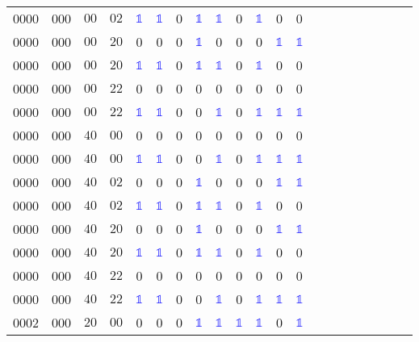 \begin{longtable*}{c| cccccccccccccccccccc }
0000& 000& $00$& $02$& \textcolor{blue}{$\mathds{1}$}& \textcolor{blue}{$\mathds{1}$}& 0& \textcolor{blue}{$\mathds{1}$}& \textcolor{blue}{$\mathds{1}$}& 0& \textcolor{blue}{$\mathds{1}$}& 0& 0\\
0000& 000& $00$& $20$& 0& 0& 0& \textcolor{blue}{$\mathds{1}$}& 0& 0& 0& \textcolor{blue}{$\mathds{1}$}& \textcolor{blue}{$\mathds{1}$}\\
0000& 000& $00$& $20$& \textcolor{blue}{$\mathds{1}$}& \textcolor{blue}{$\mathds{1}$}& 0& \textcolor{blue}{$\mathds{1}$}& \textcolor{blue}{$\mathds{1}$}& 0& \textcolor{blue}{$\mathds{1}$}& 0& 0\\
0000& 000& $00$& $22$& 0& 0& 0& 0& 0& 0& 0& 0& 0\\
0000& 000& $00$& $22$& \textcolor{blue}{$\mathds{1}$}& \textcolor{blue}{$\mathds{1}$}& 0& 0& \textcolor{blue}{$\mathds{1}$}& 0& \textcolor{blue}{$\mathds{1}$}& \textcolor{blue}{$\mathds{1}$}& \textcolor{blue}{$\mathds{1}$}\\
0000& 000& $40$& $00$& 0& 0& 0& 0& 0& 0& 0& 0& 0\\
0000& 000& $40$& $00$& \textcolor{blue}{$\mathds{1}$}& \textcolor{blue}{$\mathds{1}$}& 0& 0& \textcolor{blue}{$\mathds{1}$}& 0& \textcolor{blue}{$\mathds{1}$}& \textcolor{blue}{$\mathds{1}$}& \textcolor{blue}{$\mathds{1}$}\\
0000& 000& $40$& $02$& 0& 0& 0& \textcolor{blue}{$\mathds{1}$}& 0& 0& 0& \textcolor{blue}{$\mathds{1}$}& \textcolor{blue}{$\mathds{1}$}\\
0000& 000& $40$& $02$& \textcolor{blue}{$\mathds{1}$}& \textcolor{blue}{$\mathds{1}$}& 0& \textcolor{blue}{$\mathds{1}$}& \textcolor{blue}{$\mathds{1}$}& 0& \textcolor{blue}{$\mathds{1}$}& 0& 0\\
0000& 000& $40$& $20$& 0& 0& 0& \textcolor{blue}{$\mathds{1}$}& 0& 0& 0& \textcolor{blue}{$\mathds{1}$}& \textcolor{blue}{$\mathds{1}$}\\
0000& 000& $40$& $20$& \textcolor{blue}{$\mathds{1}$}& \textcolor{blue}{$\mathds{1}$}& 0& \textcolor{blue}{$\mathds{1}$}& \textcolor{blue}{$\mathds{1}$}& 0& \textcolor{blue}{$\mathds{1}$}& 0& 0\\
0000& 000& $40$& $22$& 0& 0& 0& 0& 0& 0& 0& 0& 0\\
0000& 000& $40$& $22$& \textcolor{blue}{$\mathds{1}$}& \textcolor{blue}{$\mathds{1}$}& 0& 0& \textcolor{blue}{$\mathds{1}$}& 0& \textcolor{blue}{$\mathds{1}$}& \textcolor{blue}{$\mathds{1}$}& \textcolor{blue}{$\mathds{1}$}\\
0002& 000& $20$& $00$& 0& 0& 0& \textcolor{blue}{$\mathds{1}$}& \textcolor{blue}{$\mathds{1}$}& \textcolor{blue}{$\mathds{1}$}& \textcolor{blue}{$\mathds{1}$}& 0& \textcolor{blue}{$\mathds{1}$}\\

\end{longtable*}
